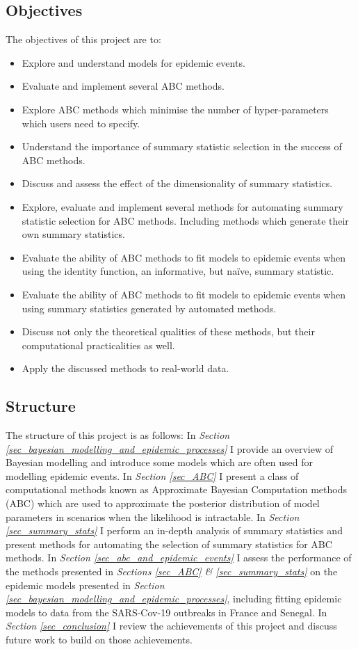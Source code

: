 \documentclass[11pt,a4paper]{article}
\theoremstyle{break}
\begin{document}
\subsection{Objectives}\label{sec_objectives}

  The objectives of this project are to:
  \begin{itemize}
    \item Explore and understand models for epidemic events.
    \item Evaluate and implement several ABC methods.
    \item Explore ABC methods which minimise the number of hyper-parameters which users need to specify.
    \item Understand the importance of summary statistic selection in the success of ABC methods.
    \item Discuss and assess the effect of the dimensionality of summary statistics.
    \item Explore, evaluate and implement several methods for automating summary statistic selection for ABC methods. Including methods which generate their own summary statistics.
    \item Evaluate the ability of ABC methods to fit models to epidemic events when using the identity function, an informative, but na\"ive, summary statistic.
    \item Evaluate the ability of ABC methods to fit models to epidemic events when using summary statistics generated by automated methods.
    \item Discuss not only the theoretical qualities of these methods, but their computational practicalities as well.
    \item Apply the discussed methods to real-world data.
  \end{itemize}

\subsection{Structure}\label{sec_structure}

  The structure of this project is as follows: In \textit{Section \ref{sec_bayesian_modelling_and_epidemic_processes}} I provide an overview of Bayesian modelling and introduce some models which are often used for modelling epidemic events. In \textit{Section \ref{sec_ABC}} I present a class of computational methods known as Approximate Bayesian Computation methods (ABC) which are used to approximate the posterior distribution of model parameters in scenarios when the likelihood is intractable. In \textit{Section \ref{sec_summary_stats}} I perform an in-depth analysis of summary statistics and present methods for automating the selection of summary statistics for ABC methods. In \textit{Section \ref{sec_abc_and_epidemic_events}} I assess the performance of the methods presented in \textit{Sections \ref{sec_ABC} \& \ref{sec_summary_stats}} on the epidemic models presented in \textit{Section \ref{sec_bayesian_modelling_and_epidemic_processes}}, including fitting epidemic models to data from the SARS-Cov-19 outbreaks in France and Senegal. In \textit{Section \ref{sec_conclusion}} I review the achievements of this project and discuss future work to build on those achievements.
\end{document}
